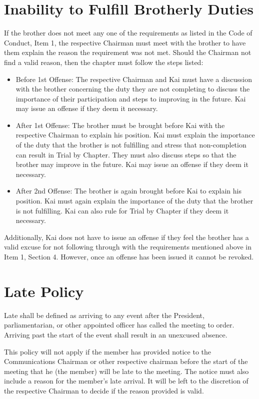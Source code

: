 
\section{Inability to Fulfill Brotherly Duties}
If the brother does not meet any one of the requirements as listed in the Code of Conduct, Item 1, the respective Chairman must meet with the brother to have them explain the reason the requirement was not met.
Should the Chairman not find a valid reason, then the chapter must follow the steps listed:

\begin{itemize}
\item Before 1st Offense: The respective Chairman and Kai must have a discussion with the brother concerning the duty they are not completing to discuss the importance of their participation and steps to improving in the future.
Kai may issue an offense if they deem it necessary.

\item After 1st Offense: The brother must be brought before Kai with the respective Chairman to explain his position.
Kai must explain the importance of the duty that the brother is not fulfilling and stress that non-completion can result in Trial by Chapter.
They must also discuss steps so that the brother may improve in the future.
Kai may issue an offense if they deem it necessary.

\item After 2nd Offense: The brother is again brought before Kai to explain his position.
Kai must again explain the importance of the duty that the brother is not fulfilling.
Kai can also rule for Trial by Chapter if they deem it necessary.

\end{itemize}
Additionally, Kai does not have to issue an offense if they feel the brother has a valid excuse for not following through with the requirements mentioned above in Item 1, Section 4.
However, once an offense has been issued it cannot be revoked.

\section{Late Policy}

Late shall be defined as arriving to any event after the President, parliamentarian, or other appointed officer has called the meeting to order.
Arriving past the start of the event shall result in an unexcused absence.

This policy will not apply if the member has provided notice to the Communications Chairman or other respective chairman before the start of the meeting that he (the member) will be late to the meeting.
The notice must also include a reason for the member’s late arrival.
It will be left to the discretion of the respective Chairman to decide if the reason provided is valid.

